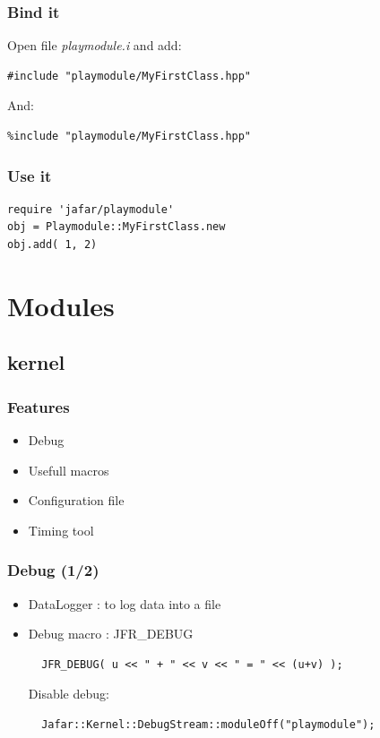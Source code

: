 \documentclass[pdf]{beamer}
\begin{document}
\begin{frame}[fragile]
  \frametitle{Bind it}
  Open file \textit{playmodule.i} and add:
  \begin{lstlisting}
#include "playmodule/MyFirstClass.hpp"
  \end{lstlisting}
  And:
  \begin{lstlisting}
%include "playmodule/MyFirstClass.hpp"
  \end{lstlisting}
\end{frame}

\begin{frame}[fragile]
  \frametitle{Use it}
  \begin{lstlisting}
require 'jafar/playmodule'
obj = Playmodule::MyFirstClass.new
obj.add( 1, 2)
  \end{lstlisting}
\end{frame}

\section{Modules}


\subsection{kernel}

\begin{frame}
  \frametitle{Features}
  \begin{itemize}
   \item Debug
   \item Usefull macros
   \item Configuration file
   \item Timing tool
  \end{itemize}
\end{frame}


\begin{frame}[fragile]
  \frametitle{Debug (1/2)}
  \begin{itemize}
    \item<1-> DataLogger : to log data into a file
    \item<2-> Debug macro : JFR\_DEBUG
      \begin{lstlisting}
  JFR_DEBUG( u << " + " << v << " = " << (u+v) );
      \end{lstlisting}
      Disable debug:
      \begin{lstlisting}
  Jafar::Kernel::DebugStream::moduleOff("playmodule");
      \end{lstlisting}
  \end{itemize}
\end{frame}
\end{document}
